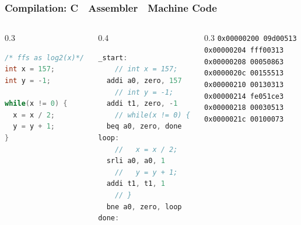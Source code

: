 \begin{frame}[fragile,shrink=10]
\frametitle{Compilation: C  Assembler  Machine Code}

\begin{columns}
\begin{column}{0.3\textwidth}
\begin{lstlisting}[language={C},columns=flexible]
/* ffs as log2(x)*/
int x = 157;
int y = -1;
 
while(x != 0) {
  x = x / 2;
  y = y + 1;
}
\end{lstlisting}
\end{column}

\begin{column}{0.4\textwidth}  
\begin{lstlisting}[language={C},columns=flexible]
_start:
    // int x = 157;
  addi a0, zero, 157
    // int y = -1;
  addi t1, zero, -1
    // while(x != 0) {
  beq a0, zero, done
loop:
    //   x = x / 2;
  srli a0, a0, 1 
    //   y = y + 1;
  addi t1, t1, 1
    // }
  bne a0, zero, loop
done:
\end{lstlisting}
\end{column}

\begin{column}{0.3\textwidth}  
\texttt{0x00000200  09d00513\\
0x00000204  fff00313\\
0x00000208  00050863\\
0x0000020c  00155513\\
0x00000210  00130313\\
0x00000214  fe051ce3\\
0x00000218  00030513\\
0x0000021c  00100073}
\end{column}

\end{columns}

\end{frame}
